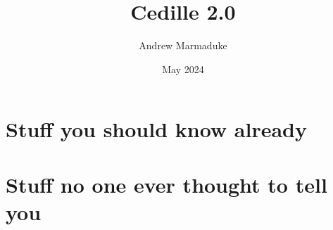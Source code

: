 \documentclass[letterpaper, 11pt]{uiowa-thesis}
\title{Cedille 2.0}
\author{Andrew Marmaduke}
\date{May 2024}
\begin{document}
\titlepage

\copyrightPage

\frontmatter








\tableofcontents

\listoffigures

\listoftables



\mainmatter







\appendix

\chapter{Stuff you should know already}
\lipsum[100-120]

\chapter{Stuff no one ever thought to tell you}
\lipsum[121-140]

\backmatter

\printbibliography
\end{document}

